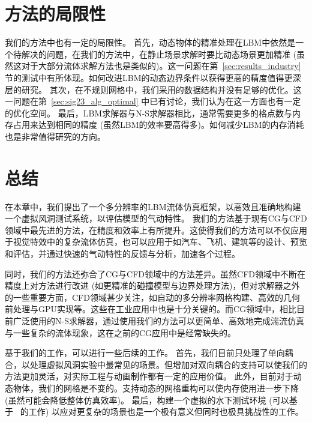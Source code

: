 \section{方法的局限性}
我们的方法中也有一定的局限性。
首先，动态物体的精准处理在LBM中依然是一个待解决的问题，在我们的方法中，在静止场景求解时要比动态场景更加精准 (虽然这对于大部分流体求解方法也是类似的)。这一问题在第~\ref{sec:results_industry} 节的测试中有所体现。如何改进LBM的动态边界条件以获得更高的精度值得更深层的研究。
其次，在不规则网格中，我们采用的数据结构并没有足够的优化。这一问题在第~\ref{sec:sig23_alg_optimal} 中已有讨论，我们认为在这一方面也有一定的优化空间。
最后，LBM求解器与N-S求解器相比，通常需要更多的格点数与内存占用来达到相同的精度 (虽然LBM的效率要高得多)。如何减少LBM的内存消耗也是非常值得研究的方向。

\section{总结}
在本章中，我们提出了一个多分辨率的LBM流体仿真框架，以高效且准确地构建一个虚拟风洞测试系统，以评估模型的气动特性。
我们的方法基于现有CG与CFD领域中最先进的方法，在精度和效率上有所提升。这使得我们的方法可以不仅应用于视觉特效中的复杂流体仿真，也可以应用于如汽车、飞机、建筑等的设计、预览和评估，并通过快速的气动特性的反馈与分析，加速各个过程。

同时，我们的方法还弥合了CG与CFD领域中的方法差异。虽然CFD领域中不断在精度上对方法进行改进 (如更精准的碰撞模型与边界处理方法)，但对求解器之外的一些重要方面，CFD领域甚少关注，如自动的多分辨率网格构建、高效的几何前处理与GPU实现等。这些在工业应用中也是十分关键的。而CG领域中，相比目前广泛使用的N-S求解器，通过使用我们的方法可以更简单、高效地完成湍流仿真与一些复杂的流体现象，这在之前的CG应用中是经常缺失的。

基于我们的工作，可以进行一些后续的工作。
首先，我们目前只处理了单向耦合，以处理虚拟风洞实验中最常见的场景。但增加对双向耦合的支持可以使我们的方法更加灵活，对实际工程与动画制作都有一定的应用价值。
此外，目前对于动态物体，我们的网格是不变的。支持动态的网格重构可以使内存使用进一步下降 (虽然可能会降低整体仿真效率)。
最后，构建一个虚拟的水下测试环境 (可以基于~\cite{Wei:2022, Wei:2023} 的工作) 以应对更复杂的场景也是一个极有意义但同时也极具挑战性的工作。